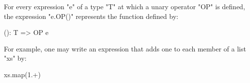 For every expression \xcd"e" of a type \xcd"T" at which a unary
operator \xcd"OP" is defined, the expression \xcd"e.OP()"
represents the function defined by:

\begin{xten}
(): T => { OP e }
\end{xten}

For example,
one may write an expression that adds one to each member of a
list \xcd"xs" by:

\begin{xten}
xs.map(1.+)
\end{xten}


